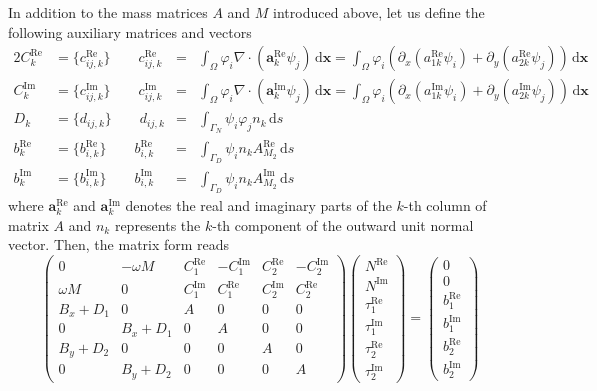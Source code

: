 \documentclass[11pt,a4paper]{article}
\begin{document}
In addition to the mass matrices $A$ and $M$ introduced above, let us define the following auxiliary matrices and vectors
\begin{alignat}{2}
C^\mathrm{Re}_k&=\{c^\mathrm{Re}_{ij,k}\} \qquad c^\mathrm{Re}_{ij,k}&=&
\int_\Omega \varphi_i\nabla\cdot(\mathbf{a}^\mathrm{Re}_k\psi_j)\,\mathrm{d}\mathbf{x}
=
\int_\Omega \varphi_i\left(\partial_x(a^\mathrm{Re}_{1k}\psi_i)+\partial_y(a^\mathrm{Re}_{2k}\psi_j)\right)\,\mathrm{d}\mathbf{x}\\
C^\mathrm{Im}_k&=\{c^\mathrm{Im}_{ij,k}\} \qquad c^\mathrm{Im}_{ij,k}&=&
\int_\Omega \varphi_i\nabla\cdot(\mathbf{a}^\mathrm{Im}_k\psi_j)\,\mathrm{d}\mathbf{x}
=
\int_\Omega \varphi_i\left(\partial_x(a^\mathrm{Im}_{1k}\psi_i)+\partial_y(a^\mathrm{Im}_{2k}\psi_j)\right)\,\mathrm{d}\mathbf{x}\\
D_k&=\{d_{ij,k}\} \qquad d_{ij,k}&=&
\int_{\Gamma_N}\psi_i\varphi_jn_k\,\mathrm{d}s\\
b^\mathrm{Re}_k&=\{b^\mathrm{Re}_{i,k}\} \qquad b^\mathrm{Re}_{i,k}&=&
\int_{\Gamma_D}\psi_in_kA^\mathrm{Re}_{M_2}\,\mathrm{d}s\\
b^\mathrm{Im}_k&=\{b^\mathrm{Im}_{i,k}\} \qquad b^\mathrm{Im}_{i,k}&=&
\int_{\Gamma_D}\psi_in_kA^\mathrm{Im}_{M_2}\,\mathrm{d}s
\end{alignat}
where $\mathbf{a}^\mathrm{Re}_k$ and $\mathbf{a}^\mathrm{Im}_k$ denotes the real and imaginary parts of the $k$-th column of matrix $A$ and $n_k$ represents the $k$-th component of the outward unit normal vector. Then, the matrix form reads
\begin{equation}
\begin{pmatrix}
0 & -\omega M & C_1^\mathrm{Re} & -C_1^\mathrm{Im} & C_2^\mathrm{Re} & -C_2^\mathrm{Im}\\[1ex]
\omega M & 0 & C_1^\mathrm{Im} & C_1^\mathrm{Re} & C_2^\mathrm{Im} & C_2^\mathrm{Re}\\[1ex]
B_x+D_1 & 0 & A & 0 & 0 & 0\\[1ex]
0 & B_x+D_1 & 0 & A & 0 & 0\\[1ex]
B_y+D_2 & 0 & 0 & 0 & A & 0\\[1ex]
0 & B_y+D_2 & 0 & 0 & 0 & A
\end{pmatrix}
\begin{pmatrix}
N^\mathrm{Re}\\[1ex]
N^\mathrm{Im}\\[1ex]
\tau_1^\mathrm{Re}\\[1ex]
\tau_1^\mathrm{Im}\\[1ex]
\tau_2^\mathrm{Re}\\[1ex]
\tau_2^\mathrm{Im}
\end{pmatrix}
=
\begin{pmatrix}
0\\[1ex]
0\\[1ex]
b_1^\mathrm{Re}\\[1ex]
b_1^\mathrm{Im}\\[1ex]
b_2^\mathrm{Re}\\[1ex]
b_2^\mathrm{Im}
\end{pmatrix}
\end{equation}
\end{document}
